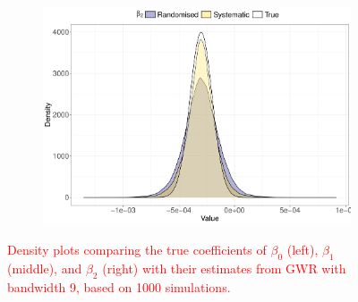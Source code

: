 \documentclass[a4paper]{article} 	%
\newcommand{\revision}[1]{\textcolor{red}{#1}}
\newcommand{\zc}[1]{\textcolor{red}{#1}}
\begin{document}
\begin{figure}[!htp]
\begin{subfigure}[b]{0.32\textwidth}
        \includegraphics[width=\textwidth]{density_mat_1k_b2.pdf}
        \label{fig:beta2_mat}
    \end{subfigure}
    \caption{\zc{Density plots comparing the true coefficients of $\beta_0$ (left), $\beta_1$ (middle), and $\beta_2$ (right) with their estimates from GWR with bandwidth 9, based on 1000 simulations.}}
    \label{fig:combinedbeta_mat}
\end{figure}







\end{document}
